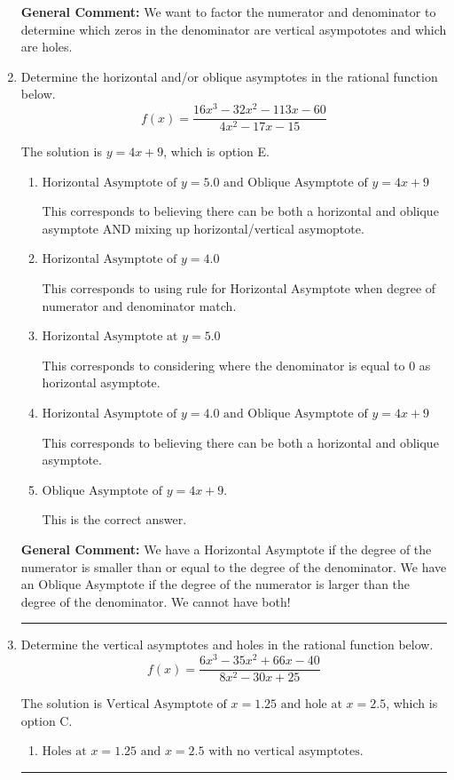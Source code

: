 \documentclass{extbook}[14pt]
\newcommand{\litem}[1]{\item #1

\rule{\textwidth}{0.4pt}}
\begin{document}
\begin{enumerate}
{\textbf{General Comment:} We want to factor the numerator and denominator to determine which zeros in the denominator are vertical asympototes and which are holes.
}
\litem{
Determine the horizontal and/or oblique asymptotes in the rational function below.
\[ f(x) = \frac{16x^{3} -32 x^{2} -113 x -60}{4x^{2} -17 x -15} \]

The solution is \( y = 4x + 9 \), which is option E.\begin{enumerate}[label=\Alph*.]
\item \( \text{Horizontal Asymptote of } y = 5.0 \text{ and Oblique Asymptote of } y = 4x + 9 \)

This corresponds to believing there can be both a horizontal and oblique asymptote AND mixing up horizontal/vertical asymoptote.
\item \( \text{Horizontal Asymptote of } y = 4.0  \)

This corresponds to using rule for Horizontal Asymptote when degree of numerator and denominator match.
\item \( \text{Horizontal Asymptote at } y = 5.0 \)

This corresponds to considering where the denominator is equal to 0 as horizontal asymptote.
\item \( \text{Horizontal Asymptote of } y = 4.0 \text{ and Oblique Asymptote of } y = 4x + 9 \)

This corresponds to believing there can be both a horizontal and oblique asymptote.
\item \( \text{Oblique Asymptote of } y = 4x + 9. \)

This is the correct answer.
\end{enumerate}

\textbf{General Comment:} We have a Horizontal Asymptote if the degree of the numerator is smaller than or equal to the degree of the denominator. We have an Oblique Asymptote if the degree of the numerator is larger than the degree of the denominator. We cannot have both!
}
\litem{
Determine the vertical asymptotes and holes in the rational function below.
\[ f(x) = \frac{6x^{3} -35 x^{2} +66 x -40}{8x^{2} -30 x + 25} \]

The solution is \( \text{Vertical Asymptote of } x = 1.25 \text{ and hole at } x = 2.5 \), which is option C.\begin{enumerate}[label=\Alph*.]
\item \( \text{Holes at } x = 1.25 \text{ and } x = 2.5 \text{ with no vertical asymptotes.} \)


\end{enumerate}}
\end{enumerate}
\end{document}
